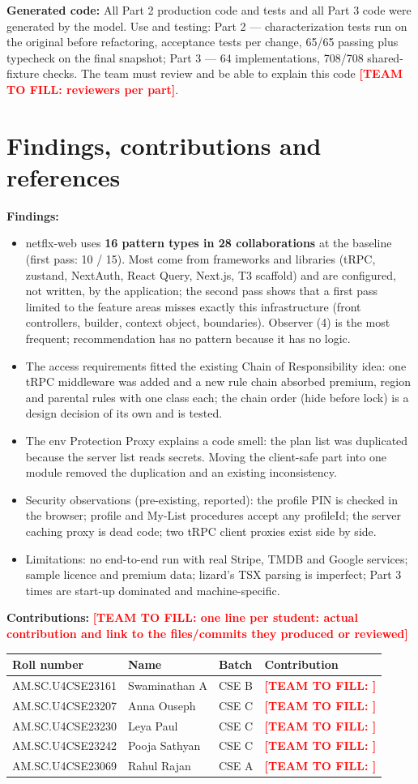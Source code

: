 \documentclass[11pt,a4paper]{article}
\newcommand{\entry}[2]{\textbf{#1:} #2\par}
\newcommand{\todo}[1]{\textcolor{red}{\textbf{[TEAM TO FILL: #1]}}}
\begin{document}
\entry{Generated code}{All Part 2 production code and tests and all Part 3 code were generated by the model. Use and testing: Part 2 --- characterization tests run on the original before refactoring, acceptance tests per change, 65/65 passing plus typecheck on the final snapshot; Part 3 --- 64 implementations, 708/708 shared-fixture checks. The team must review and be able to explain this code \todo{reviewers per part}.}

\section{Findings, contributions and references}
\entry{Findings}{\begin{itemize}
\item netflx-web uses \textbf{16 pattern types in 28 collaborations} at the baseline (first pass: 10 / 15). Most come from frameworks and libraries (tRPC, zustand, NextAuth, React Query, Next.js, T3 scaffold) and are configured, not written, by the application; the second pass shows that a first pass limited to the feature areas misses exactly this infrastructure (front controllers, builder, context object, boundaries). Observer (4) is the most frequent; recommendation has no pattern because it has no logic.
\item The access requirements fitted the existing Chain of Responsibility idea: one tRPC middleware was added and a new rule chain absorbed premium, region and parental rules with one class each; the chain order (hide before lock) is a design decision of its own and is tested.
\item The env Protection Proxy explains a code smell: the plan list was duplicated because the server list reads secrets. Moving the client-safe part into one module removed the duplication and an existing inconsistency.
\item Security observations (pre-existing, reported): the profile PIN is checked in the browser; profile and My-List procedures accept any profileId; the server caching proxy is dead code; two tRPC client proxies exist side by side.
\item Limitations: no end-to-end run with real Stripe, TMDB and Google services; sample licence and premium data; lizard's TSX parsing is imperfect; Part 3 times are start-up dominated and machine-specific.
\end{itemize}}
\entry{Contributions}{\todo{one line per student: actual contribution and link to the files/commits they produced or reviewed}\par\medskip
\begin{tabularx}{\linewidth}{@{}lllX@{}}\toprule Roll number & Name & Batch & Contribution\\\midrule
AM.SC.U4CSE23161 & Swaminathan A & CSE B & \todo{}\\
AM.SC.U4CSE23207 & Anna Ouseph & CSE C & \todo{}\\
AM.SC.U4CSE23230 & Leya Paul & CSE C & \todo{}\\
AM.SC.U4CSE23242 & Pooja Sathyan & CSE C & \todo{}\\
AM.SC.U4CSE23069 & Rahul Rajan & CSE A & \todo{}\\\bottomrule\end{tabularx}}
\end{document}
